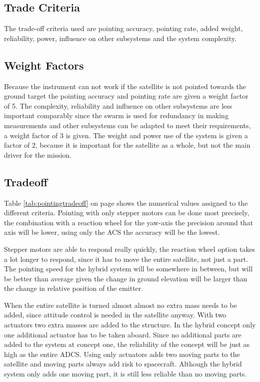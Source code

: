 \subsection{Trade Criteria}
The trade-off criteria used are pointing accuracy, pointing rate, added weight, reliability, power, influence on other subsystems and the system complexity.

\subsection{Weight Factors}
Because the instrument can not work if the satellite is not pointed towards the ground target the pointing accuracy and pointing rate are given a weight factor of 5. The complexity, reliability and influence on other subsystems are less important comparably since the swarm is used for redundancy in making measurements and other subsystems can be adapted to meet their requirements, a weight factor of 3 is given. The weight and power use of the system is given a factor of 2, because it is important for the satellite as a whole, but not the main driver for the mission.

\subsection{Tradeoff}
Table \ref{tab:pointingtradeoff} on page \pageref{tab:pointingtradeoff} shows the numerical values assigned to the different criteria. 
Pointing with only stepper motors can be done most precisely, the combination with a reaction wheel for the yaw-axis the precision around that axis will be lower, using only the \ac{ACS} the accuracy will be the lowest. 

Stepper motors are able to respond really quickly, the reaction wheel option takes a lot longer to respond, since it has to move the entire satellite, not just a part. The pointing speed for the hybrid system will be somewhere in between, but will be better than average given the change in ground elevation will be larger than the change in relative position of the emitter.

When the entire satellite is turned almost almost no extra mass needs to be added, since attitude control is needed in the satellite anyway. With two actuators two extra masses are added to the structure. In the hybrid concept only one additional actuator has to be taken aboard.
Since no additional parts are added to the system at concept one, the reliability of the concept will be just as high as the entire \ac{ADCS}. Using only actuators adds two moving parts to the satellite and moving parts always add risk to spacecraft. Although the hybrid system only adds one moving part, it is still less reliable than no moving parts.

